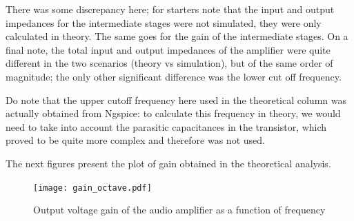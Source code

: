   
There was some discrepancy here; for starters note that the input and output impedances for the intermediate stages were not simulated, they were only calculated in theory. The same goes for the gain of the intermediate stages. On a final note, the total input and output impedances of the amplifier were quite different in the two scenarios (theory vs simulation), but of the same order of magnitude; the only other significant difference was the lower cut off frequency.\par

Do note that the upper cutoff frequency here used in the theoretical column was actually obtained from Ngspice: to calculate this frequency in theory, we would need to take into account the parasitic capacitances in the transistor, which proved to be quite more complex and therefore was not used.


  The next figures present the plot of gain obtained in the theoretical analysis.


\begin{figure}[H] \centering
\texttt{[image: gain\_octave.pdf]}
\caption{Output voltage gain of the audio amplifier as a function of frequency}
\label{fig:gain_octa}
\end{figure}




\pagebreak


